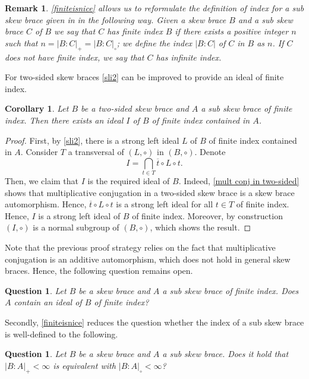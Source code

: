 \documentclass{amsart}
\newtheorem{cor}[thm]{Corollary}
\newtheorem{question}[thm]{Question}
\newtheorem{rem}[thm]{Remark}
\begin{document}
\begin{rem}
    \cref{finiteisnice} allows us to reformulate the definition of index for a sub skew brace given in \cite{index} in the following way. Given a skew brace $B$ and a sub skew brace $C$ of $B$ we say that $C$ has \textit{finite index} $B$ if there exists a positive integer $n$ such that $n=|B:C|_+=|B:C|_\circ$; we define the \textit{index} $|B:C|$ of $C$ in $B$ as $n$. If $C$ does not have finite index, we say that $C$ has \textit{infinite index}.
\end{rem}
For two-sided skew braces \cref{sli2} can be improved to provide an ideal of finite index.
\begin{cor}
    Let $B$ be a two-sided skew brace and $A$ a sub skew brace of finite index. Then there exists an ideal $I$ of $B$ of finite index contained in $A$.
\end{cor}
\begin{proof}
    First, by \cref{sli2}, there is a strong left ideal $L$ of $B$ of finite index contained in $A$. Consider $T$ a transversal of $(L,\circ)$ in $(B,\circ)$. Denote $$ I= \bigcap_{t\in T} \overline{t} \circ  L \circ  t.$$ Then, we claim that $I$ is the required ideal of $B$. Indeed, \cref{mult conj in two-sided} shows that multiplicative conjugation in a two-sided skew brace is a skew brace automorphism. Hence, $\overline{t}\circ L\circ t$ is a strong left ideal for all $t\in T$ of finite index. Hence, $I$ is a strong left ideal of $B$ of finite index. Moreover, by construction $(I,\circ)$ is a normal subgroup of $(B,\circ)$, which shows the result.
\end{proof}

Note that the previous proof strategy relies on the fact that multiplicative conjugation is an additive automorphism, which does not hold in general skew braces. Hence, the following question remains open.

\begin{question}
    Let $B$ be a skew brace and $A$ a sub skew brace of finite index. Does $A$ contain an ideal of $B$ of finite index?
\end{question}

Secondly, \cref{finiteisnice} reduces the question whether the index of a sub skew brace is well-defined to the following.

\begin{question}\label{equivalencefiniteindex}
    Let $B$ be a skew brace and $A$ a sub skew brace. Does it hold that $|B:A|_+<\infty$ is equivalent with $|B:A|_\circ< \infty$?
\end{question}
\end{document}
